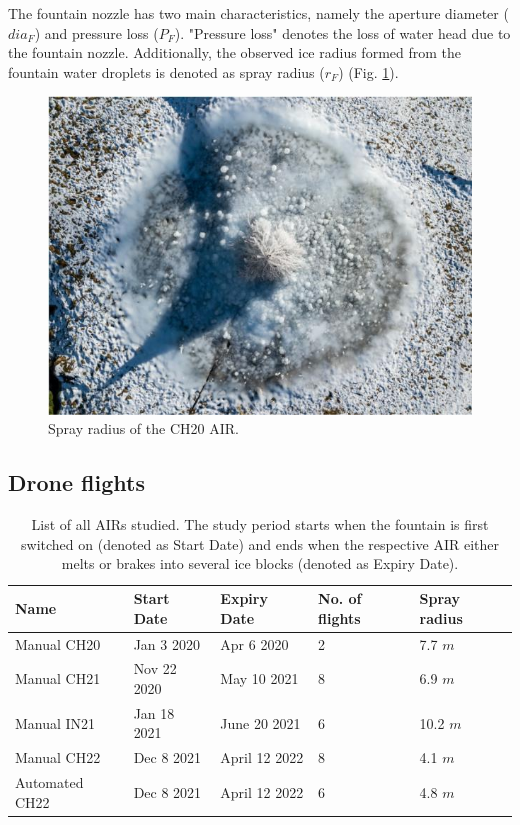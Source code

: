 The fountain nozzle has two main characteristics, namely the aperture diameter ($dia_{F}$) and pressure loss
($P_{F}$). "Pressure loss" denotes the loss of water head due to the fountain nozzle. Additionally,
the observed ice radius formed from the fountain water droplets is denoted as spray radius ($r_F$) (Fig.
\ref{fig:CH20_rad}).

\begin{figure}[htb]
	\centering
	\includegraphics[width=\textwidth/2]{figs/CH20_sprayrad.jpg}
	\caption{Spray radius of the CH20 \ac{AIR}. }
	\label{fig:CH20_rad}
\end{figure}

\subsection{Drone flights}

\begin{table}
	\centering
	\caption{List of all \ac{AIRs} studied. The study period starts when the fountain is first switched on
		(denoted as Start Date) and ends when the respective \ac{AIR} either melts or brakes into several ice blocks
		(denoted as Expiry Date). }
	\label{tab:AIRs}
	\begin{tabular}{|lllll|}
		\hline
		\textbf{Name}    & \textbf{Start Date} & \textbf{Expiry Date} & \textbf{No. of flights} & \textbf{Spray
		radius}                                                                                                 \\ \hline
		Manual CH20 & Jan 3 2020          & Apr 6 2020           & 2                       & 7.7 $m$       \\
		Manual CH21 & Nov 22 2020         & May 10 2021          & 8                       & 6.9 $m$       \\
		Manual IN21 & Jan 18 2021         & June 20 2021         & 6                       & 10.2 $m$      \\
		Manual CH22 & Dec 8 2021          & April 12 2022        & 8                       & 4.1 $m$       \\
		Automated CH22   & Dec 8 2021          & April 12 2022        & 6                       & 4.8 $m$       \\ \hline
	\end{tabular}
\end{table}


